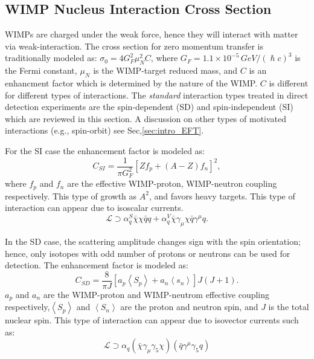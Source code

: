 \subsection{WIMP Nucleus Interaction Cross Section}
\label{subsubsec:WIMP_CS}

WIMPs are charged under the weak force, hence they will interact with matter via weak-interaction. The cross section for zero momentum transfer is traditionally modeled as: $\sigma_0 = 4G^2_F\mu_N^2C$, where $G_F = 1.1\times 10^{-5}\,GeV/(\hslash c)^3$ is the Fermi constant, $\mu_N$ is the WIMP-target reduced mass, and $C$ is an enhancment factor which is determined by the nature of the WIMP. $C$ is different for different types of interactions. The \textit{standard} interaction types treated in direct detection experiments are the spin-dependent (SD) and spin-independent (SI) which are reviewed in this section. A discussion on other types of motivated interactions (e.g., spin-orbit) see Sec,\ref{sec:intro_EFT}.

For the SI case the enhancement factor is modeled as:
\begin{equation}
C_{SI} = \frac{1}{\pi G_F^2}[Zf_p + (A-Z)f_n]^2,
\end{equation} 
where $f_p$ and $f_n$ are the effective WIMP-proton, WIMP-neutron coupling respectively. This type of growth as $A^2$, and favors heavy targets. This type of interaction can appear due to isoscalar currents.
\begin{equation}
\mathcal{L} \supset \alpha_q^S \bar{\chi} \chi \bar{q}q + \alpha_q^V\bar{\chi}\gamma_\mu\chi\bar{q}\gamma^\mu q.  
\end{equation}

In the SD case, the scattering amplitude changes sign with the spin orientation; hence, only isotopes with odd number of protons  or neutrons can be used for detection. The enhancement factor is modeled as:
\begin{equation}
C_{SD} = \frac{8}{\pi J}[a_p\left<S_p\right> + a_n\left<s_n\right>]J(J+1).
\end{equation}  
$a_p$ and $a_n$ are the WIMP-proton and WIMP-neutrom effective coupling respectively,$\left<S_p\right>$ and  $\left<S_n\right>$ are the proton and neutron spin, and $J$ is the total nuclear spin. This type of interaction can appear due to isovector currents such as:
\begin{equation}
\mathcal{L} \supset \alpha_q(\bar{\chi}\gamma_\mu\gamma_5\chi)(\bar{q}\gamma^\mu\gamma_5q)
\end{equation}
